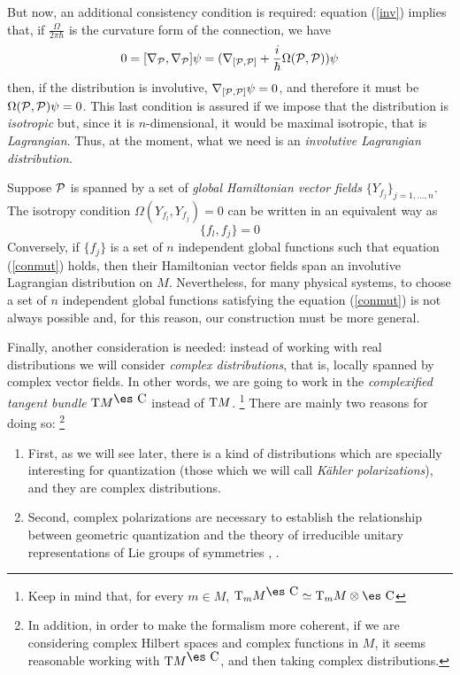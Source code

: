 \documentclass[12pt]{article}
\theoremstyle{plain}
\def\beq{\begin{equation}}
\def\eeq{\end{equation}}
\def\dst{\(}
\def\P{{\cal P}}
\def\Complex{\mbox{\es C}}
\def\Tan{{\rm T}}
\begin{document}
But now, an additional consistency condition is required:
equation (\ref{inv}) implies that,
if \dst\frac{\Omega}{2\pi\hbar}\)
is the curvature form of the connection, we have
$$
0 = [\nabla_\P ,\nabla_\P ]\psi =
(\nabla_{[\P ,\P ]} + \frac{i}{\hbar}\Omega (\P ,\P ))\psi
$$
then, if the distribution is involutive,
$\nabla_{[\P ,\P ]}\psi = 0$,
and therefore it must be
$\Omega (\P ,\P )\psi = 0$.
This last condition is assured if we impose that
the distribution is {\it isotropic}
but, since it is $n$-dimensional,
it would be maximal isotropic, that is {\it Lagrangian}.
Thus, at the moment, what we need is an
{\it involutive Lagrangian distribution}.

Suppose $\P$ is spanned by a set of
{\it global Hamiltonian vector fields\/}
$\{ Y_{f_j} \}_{j=1,\ldots ,n}$.
The isotropy condition
$\Omega (Y_{f_l},Y_{f_j}) = 0$
can be written in an equivalent way as
\beq
\{ f_l,f_j \} = 0
\label{conmut}
\eeq
Conversely, if $\{ f_j \}$ is a set of $n$
independent global functions such that equation
(\ref{conmut}) holds, then their Hamiltonian vector fields
span an involutive Lagrangian distribution on $M$.
Nevertheless, for many physical systems, to choose a set of
$n$ independent global functions satisfying the equation
(\ref{conmut}) is not always possible
and, for this reason, our construction must be more general.

Finally, another consideration is needed:
instead of working with real distributions
we will consider
{\it complex distributions},
that is, locally spanned by complex vector fields.
In other words, we are going to work in the
{\it complexified tangent bundle\/}
$\Tan M^{\Complex}$
instead of $\Tan M$.%
\footnote
{Keep in mind that, for every $m \in M$,
$\Tan_m M^{\Complex} \simeq \Tan_m M \otimes \Complex$}
There are mainly two reasons for doing so:%
\footnote{
In addition, in order to make the formalism more coherent,
if we are considering complex Hilbert spaces and
complex functions in $M$,
it seems reasonable working with $\Tan M^{\Complex}$,
and then taking complex distributions.}
\begin{enumerate}
\item
First, as we will see later, there is a kind of distributions which are
specially interesting for quantization
(those which we will call {\it K\"ahler polarizations}),
and they are complex distributions.
\item
Second, complex polarizations are necessary to establish the
relationship
between  geometric quantization and
the theory of irreducible unitary representations
of Lie groups of symmetries
\cite{Ki-gq}, \cite{Wn-77}.
\end{enumerate}
\end{document}

